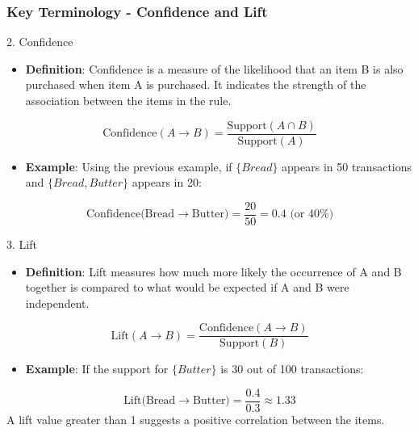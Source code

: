 \documentclass{beamer}
\begin{document}
\begin{frame}[fragile]
    \frametitle{Key Terminology - Confidence and Lift}
    \begin{block}{2. Confidence}
        \begin{itemize}
            \item \textbf{Definition}: Confidence is a measure of the likelihood that an item B is also purchased when item A is purchased. 
            It indicates the strength of the association between the items in the rule.
        \end{itemize}
        
        \begin{equation}
            \text{Confidence}(A \rightarrow B) = \frac{\text{Support}(A \cap B)}{\text{Support}(A)}
        \end{equation}

        \begin{itemize}
            \item \textbf{Example}: Using the previous example, if $\{Bread\}$ appears in 50 transactions and $\{Bread, Butter\}$ appears in 20:
        \end{itemize}

        \begin{equation}
            \text{Confidence(Bread} \rightarrow \text{Butter)} = \frac{20}{50} = 0.4 \text{ (or 40\%)}
        \end{equation}

        \begin{block}{3. Lift}
            \begin{itemize}
                \item \textbf{Definition}: Lift measures how much more likely the occurrence of A and B together is compared to what 
                would be expected if A and B were independent.
            \end{itemize}

            \begin{equation}
                \text{Lift}(A \rightarrow B) = \frac{\text{Confidence}(A \rightarrow B)}{\text{Support}(B)}
            \end{equation}

            \begin{itemize}
                \item \textbf{Example}: If the support for $\{Butter\}$ is 30 out of 100 transactions:
            \end{itemize}

            \begin{equation}
                \text{Lift(Bread} \rightarrow \text{Butter)} = \frac{0.4}{0.3} \approx 1.33
            \end{equation}
            A lift value greater than 1 suggests a positive correlation between the items.
        \end{block}
    \end{block}
\end{frame}
\end{document}
